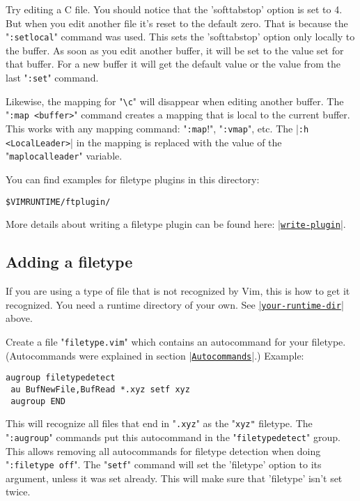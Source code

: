 Try editing a C file.
You should notice that the 'softtabstop' option is set to 4.
But when you edit another file it's reset to the default zero.
That is because the "\verb!:setlocal!" command was used.
This sets the 'softtabstop' option only locally to the buffer.
As soon as you edit another buffer, it will be set to the value set for that buffer.
For a new buffer it will get the default value or the value from the last "\verb!:set!" command.

Likewise, the mapping for "\verb!\c!" will disappear when editing another buffer.
The "\verb!:map <buffer>!" command creates a mapping that is local to the current buffer.
This works with any mapping command: "\verb!:map!!", "\verb!:vmap!", etc.
The |\verb!:h <LocalLeader>!| in the mapping is replaced with the value of the "\verb!maplocalleader!" variable.

You can find examples for filetype plugins in this directory:

\begin{Verbatim}[samepage=true]
 $VIMRUNTIME/ftplugin/
\end{Verbatim}

More details about writing a filetype plugin can be found here: \hyperref[write-plugin]{|\texttt{write-plugin}|}.
\subsection{Adding a filetype}
\label{Adding a filetype}
If you are using a type of file that is not recognized by Vim, this is how to get it recognized.
You need a runtime directory of your own.
See \hyperref[your-runtime-dir]{|\texttt{your-runtime-dir}|} above.

Create a file "\verb!filetype.vim!" which contains an autocommand for your filetype.
(Autocommands were explained in section |\hyperref[Autocommands]{\texttt{Autocommands}}|.)
Example:

\begin{Verbatim}[samepage=true]
 augroup filetypedetect
 au BufNewFile,BufRead *.xyz setf xyz
 augroup END
\end{Verbatim}

This will recognize all files that end in "\verb!.xyz!" as the "\verb!xyz"! filetype.
The "\verb!:augroup!" commands put this autocommand in the "\verb!filetypedetect!" group.
This allows removing all autocommands for filetype detection when doing "\verb!:filetype off!".
The "\verb!setf!" command will set the 'filetype' option to its argument, unless it was set already.
This will make sure that 'filetype' isn't set twice.

